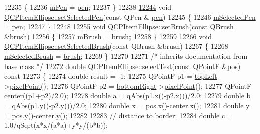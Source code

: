 \begin{DoxyCode}
12235 \{
12236   \hyperlink{a00035_a16ad9389acf028a7e4ac8fd7a550b2e4}{mPen} = \hyperlink{a00035_adb67471eabaf1214c99767f1653ca0ed}{pen};
12237 \}
12238 
\hypertarget{a00115_source_l12244}{}\hyperlink{a00035_a6c542fba1dc918041c583f58a50dde99}{12244} \textcolor{keywordtype}{void} \hyperlink{a00035_a6c542fba1dc918041c583f58a50dde99}{QCPItemEllipse::setSelectedPen}(\textcolor{keyword}{const} QPen &
      \hyperlink{a00116_a1f13fffa0a0faac34ec342973e613a4a}{pen})
12245 \{
12246   \hyperlink{a00035_a57b047abfce6f1a84ed46ca668c90e21}{mSelectedPen} = \hyperlink{a00035_adb67471eabaf1214c99767f1653ca0ed}{pen};
12247 \}
12248 
\hypertarget{a00115_source_l12255}{}\hyperlink{a00035_a49fc74e6965834e873d027d026def798}{12255} \textcolor{keywordtype}{void} \hyperlink{a00035_a49fc74e6965834e873d027d026def798}{QCPItemEllipse::setBrush}(\textcolor{keyword}{const} QBrush &brush)
12256 \{
12257   \hyperlink{a00035_a6fa59478cd3ad1b10e6c1f6cedc84bd6}{mBrush} = \hyperlink{a00035_ac012e4fd59fdb1afb6554937bae8f7e1}{brush};
12258 \}
12259 
\hypertarget{a00115_source_l12266}{}\hyperlink{a00035_a9693501cfaa43a099655c75bed0dab3f}{12266} \textcolor{keywordtype}{void} \hyperlink{a00035_a9693501cfaa43a099655c75bed0dab3f}{QCPItemEllipse::setSelectedBrush}(\textcolor{keyword}{const} QBrush &brush)
12267 \{
12268   \hyperlink{a00035_a2e49d5547478aa36910ed8a2dcc8a5c0}{mSelectedBrush} = \hyperlink{a00035_ac012e4fd59fdb1afb6554937bae8f7e1}{brush};
12269 \}
12270 
12271 \textcolor{comment}{/* inherits documentation from base class */}
\hypertarget{a00115_source_l12272}{}\hyperlink{a00035_ac456143773711ea2e3782e51ff2f7eb4}{12272} \textcolor{keywordtype}{double} \hyperlink{a00035_ac456143773711ea2e3782e51ff2f7eb4}{QCPItemEllipse::selectTest}(\textcolor{keyword}{const} QPointF &pos)\textcolor{keyword}{ const}
12273 \textcolor{keyword}{}\{
12274   \textcolor{keywordtype}{double} result = -1;
12275   QPointF p1 = \hyperlink{a00035_a12fd8420c06718d0c8a2303d6a652848}{topLeft}->\hyperlink{a00038_ae490f9c76ee2ba33752c495d3b6e8fb5}{pixelPoint}();
12276   QPointF p2 = \hyperlink{a00035_ab73c8deafc0d8d1ef7d75b6cdcc37159}{bottomRight}->\hyperlink{a00038_ae490f9c76ee2ba33752c495d3b6e8fb5}{pixelPoint}();
12277   QPointF center((p1+p2)/2.0);
12278   \textcolor{keywordtype}{double} a = qAbs(p1.x()-p2.x())/2.0;
12279   \textcolor{keywordtype}{double} b = qAbs(p1.y()-p2.y())/2.0;
12280   \textcolor{keywordtype}{double} x = pos.x()-center.x();
12281   \textcolor{keywordtype}{double} y = pos.y()-center.y();
12282   
12283   \textcolor{comment}{// distance to border:}
12284   \textcolor{keywordtype}{double} c = 1.0/qSqrt(x*x/(a*a)+y*y/(b*b));

\end{DoxyCode}

